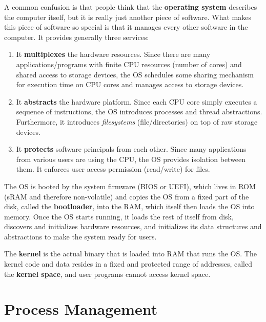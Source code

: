 \documentclass{article}
\begin{document}
  \begin{definition}
    A common confusion is that people think that the \textbf{operating system} describes the computer itself, but it is really just another piece of software. What makes this piece of software so special is that it manages every other software in the computer. It provides generally three services: 
    \begin{enumerate}
      \item It \textbf{multiplexes} the hardware resources. Since there are many applications/programs with finite CPU resources (number of cores) and shared access to storage devices, the OS schedules some sharing mechanism for execution time on CPU cores and manages access to storage devices.
      \item It \textbf{abstracts} the hardware platform. Since each CPU core simply executes a sequence of instructions, the OS introduces processes and thread abstractions. Furthermore, it introduces \textit{filesystems} (file/directories) on top of raw storage devices. 
      \item It \textbf{protects} software principals from each other. Since many applications from various users are using the CPU, the OS provides isolation between them. It enforces user access permission (read/write) for files. 
    \end{enumerate}
  \end{definition}

  The OS is booted by the system firmware (BIOS or UEFI), which lives in ROM (sRAM and therefore non-volatile) and copies the OS from a fixed part of the disk, called the \textbf{bootloader}, into the RAM, which itself then loads the OS into memory. Once the OS starts running, it loads the rest of itself from disk, discovers and initializes hardware resources, and initializes its data structures and abstractions to make the system ready for users.

  \begin{definition}[Kernel]
    The \textbf{kernel} is the actual binary that is loaded into RAM that runs the OS. The kernel code and data resides in a fixed and protected range of addresses, called the \textbf{kernel space}, and user programs cannot access kernel space. 
  \end{definition}

\section{Process Management}
\end{document}

